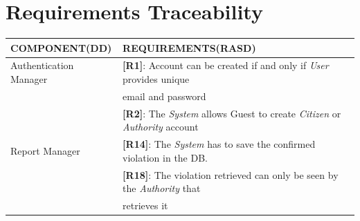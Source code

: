 \documentclass{article}
\begin{document}
\section{Requirements Traceability}
\begin{center}
    \begin{tabular}{ | l | l |}
        \hline
        COMPONENT(DD) & REQUIREMENTS(RASD) \\
        \hline
        Authentication Manager & \textbf{[R1]}: Account can be created if and only if \textit{User} provides unique \\ 
                               & email and password \\
                               & \textbf{[R2]}: The \textit{System} allows Guest to create \textit{Citizen} or \textit{Authority} account \\
        \hline
        Report Manager  & \textbf{[R14]}: The \textit{System} has to save the confirmed violation in the DB. \\
                        & \textbf{[R18]}: The violation retrieved can only be seen by the \textit{Authority} that \\
                        & retrieves it \\
                        

\end{tabular}
\end{center}
\end{document}
